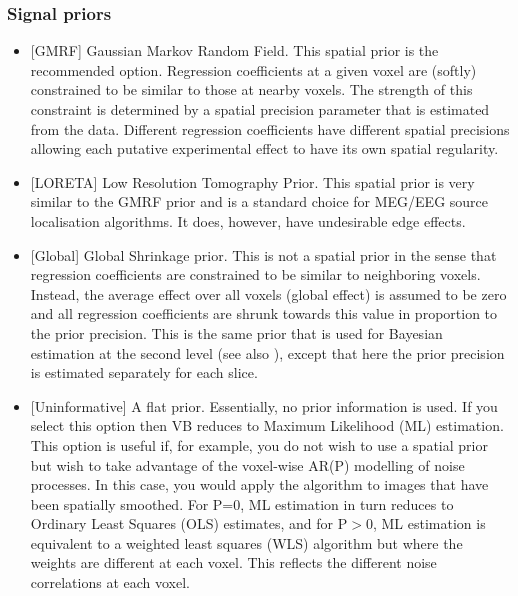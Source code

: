 \documentclass[a4paper,titlepage]{book}
\begin{document}
\subsubsection{Signal priors}
\begin{itemize}

\item{[GMRF] Gaussian Markov Random Field. This spatial prior is the recommended option. Regression coefficients at a given voxel are (softly) constrained to be similar to those at nearby voxels. The strength of this constraint is determined by a spatial precision parameter that is estimated from the data. Different regression coefficients have different spatial precisions allowing each putative experimental effect to have its own spatial regularity. }

                                                                                                            

\item{[LORETA] Low Resolution Tomography Prior. This spatial prior is very similar to the GMRF prior and is a standard choice for MEG/EEG source localisation algorithms. It does, however, have undesirable edge effects.}

                                                                                                            

\item{[Global] Global Shrinkage prior. This is not a spatial prior in the sense that regression coefficients are constrained to be similar to neighboring voxels. Instead, the average effect over all voxels (global effect) is assumed to be zero and all regression coefficients are shrunk towards this value in proportion to the prior precision. This is the same prior that is used for Bayesian estimation at the second level 
(see also \cite{karl_posterior}), except that here the prior precision is estimated separately for each slice. }

                                                                                                            

\item{[Uninformative] A flat prior. Essentially, no prior information is used. If you select this option then VB reduces to Maximum Likelihood (ML) estimation. This option is useful if, for example, you do not wish to use a spatial prior but wish to take advantage of the voxel-wise AR(P) modelling of noise processes. In this case, you would apply the algorithm to images that have been spatially smoothed. For P=0, ML estimation in turn reduces to Ordinary Least Squares (OLS) estimates, and for P$>$0, ML estimation is equivalent to a weighted least squares (WLS) algorithm but where the weights are different at each voxel. This reflects the different noise correlations at each voxel. }

\end{itemize}
\end{document}
